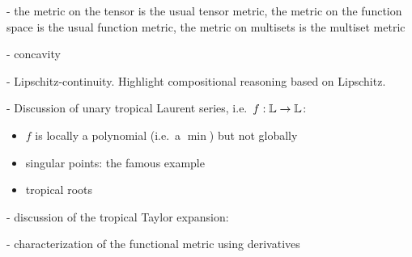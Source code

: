 

- the metric on the tensor is the usual tensor metric, the metric on the function space is the usual function metric, the metric on multisets is the multiset metric

- concavity

- Lipschitz-continuity. Highlight compositional reasoning based on Lipschitz.

- Discussion of unary tropical Laurent series, i.e.~$f:\mathbb{L} \to \mathbb{L}$:
\begin{itemize}

\item $f$ is locally a polynomial (i.e.~a $\min$) but not globally

\item singular points: the famous example

\item tropical roots


\end{itemize}



- discussion of the tropical Taylor expansion: 


- characterization of the functional metric using derivatives







